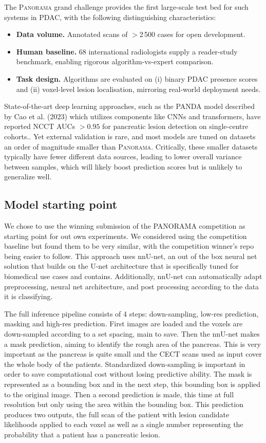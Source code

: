 \documentclass[conference]{IEEEtran}
\begin{document}
The \textsc{Panorama} grand challenge provides the first large-scale test bed for such systems in PDAC, with the following distinguishing characteristics:  
\begin{itemize}[leftmargin=*]
  \item \textbf{Data volume.} Annotated scans of $>$2\,500 cases for open development.
  \item \textbf{Human baseline.} 68 international radiologists supply a reader-study benchmark, enabling rigorous algorithm-vs-expert comparison.
  \item \textbf{Task design.} Algorithms are evaluated on (i) binary PDAC presence scores and (ii) voxel-level lesion localisation, mirroring real-world deployment needs.
\end{itemize}

State-of-the-art deep learning approaches, such as the PANDA model described by Cao et al. (2023) which utilizes components like CNNs and transformers, have reported NCCT AUCs $>0.95$ for pancreatic lesion detection on single-centre cohorts.\cite{Cao2023,PANDA2023}. Yet external validation is rare, and most models are tuned on datasets an order of magnitude smaller than \textsc{Panorama}. Critically, these smaller datasets typically have fewer different data sources, leading to lower overall variance between samples, which will likely boost prediction scores but is unlikely to generalize well.

\subsection{Model starting point}
We chose to use the winning submission of the PANORAMA competition as starting point for out own experiments. We considered using the competition baseline but found them to be very similar, with the competition winner's repo being easier to follow. This approach uses nnU-net, \cite{b1} an out of the box neural net solution that builds on the U-net architecture that is specifically tuned for biomedical use cases and contains. Additionally, nnU-net can automatically adapt preprocessing, neural net architecture, and post processing according to the data it is classifying.

The full inference pipeline consists of 4 steps: down-sampling, low-res prediction, masking and high-res prediction. First images are loaded and the voxels are down-sampled according to a set spacing, main to save. Then the nnU-net makes a mask prediction, aiming to identify the rough area of the pancreas. This is very important as the pancreas is quite small and the CECT scans used as input cover the whole body of the patients. Standardized down-sampling is important in order to save computational cost without losing predictive ability. The mask is represented as a bounding box and in the next step, this bounding box is applied to the original image. Then a second prediction is made, this time at full resolution but only using the area within the bounding box. This prediction produces two outputs, the full scan of the patient with lesion candidate likelihoods applied to each voxel as well as a single number representing the probability that a patient has a pancreatic lesion.
\end{document}
